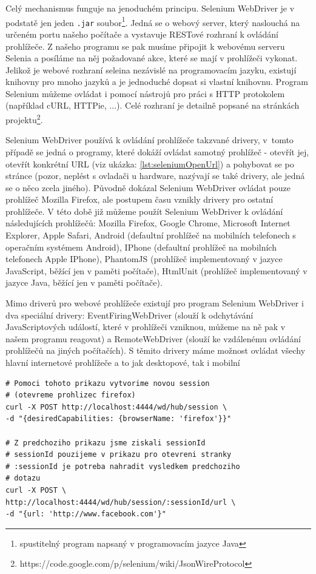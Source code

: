 \documentclass[thesis=M,czech]{FITthesis}[2013/05/10]
\begin{document}
Celý mechanismus funguje na jenoduchém principu. Selenium WebDriver  
je v podstatě jen jeden \verb|.jar| 
soubor\footnote{spustitelný program napsaný v programovacím 
jazyce Java}. 
Jedná se o webový server, který naslouchá na určeném portu našeho 
počítače a vystavuje RESTové rozhraní k ovládání prohlížeče. Z našeho 
programu se pak musíme připojit k webovému serveru Selenia a posíláme 
na něj požadované akce, které se mají v prohlížeči vykonat. Jelikož je 
webové rozhraní seleina nezávislé na programovacím jazyku, existují 
knihovny pro mnoho jazyků a je jednoduché dopsat si vlastní knihovnu. 
Program Selenium můžeme ovládat i pomocí nástrojů pro práci s HTTP 
protokolem (například cURL, HTTPie, ...). Celé rozhraní je detailně 
popsané na stránkách 
projektu\footnote{https://code.google.com/p/selenium/wiki/JsonWireProtocol}.

Selenium WebDriver používá k ovládání prohlížeče takzvané drivery, 
v~tomto případě se jedná o programy, které dokáží ovládat samotný 
prohlížeč - otevřít jej, otevřít konkrétní 
URL (viz ukázka: \ref{lst:seleniumOpenUrl}) a pohybovat se 
po stránce (pozor, neplést s ovladači u hardware, nazývají se také 
drivery, ale jedná se o něco zcela jiného). Původně dokázal Selenium 
WebDriver ovládat pouze prohlížeč Mozilla Firefox, ale postupem času 
vznikly drivery pro ostatní prohlížeče. V této době již můžeme použít 
Selenium WebDriver k ovládání následujících prohlížečů: 
Mozilla Firefox, Google Chrome, Microsoft Internet Explorer, Apple 
Safari, Android (defaultní prohlížeč na mobilních telefonech s 
operačním systémem Android), IPhone (defaultní prohlížeč na mobilních 
telefonech Apple IPhone), PhantomJS (prohlížeč implementovaný v jazyce 
JavaScript, běžící jen v paměti počítače), HtmlUnit (prohlížeč 
implementovaný v jazyce Java, běžící jen v paměti počítače). 

Mimo driverů pro webové prohlížeče existují pro 
program Selenium WebDriver i dva speciální 
drivery: EventFiringWebDriver (slouží k odchytávání JavaScriptových 
událostí, které v prohlížeči vzniknou, můžeme na ně pak v našem 
programu reagovat) a RemoteWebDriver (slouží ke vzdálenému ovládání 
prohlížečů na jiných počítačích). S těmito drivery máme možnost 
ovládat všechy hlavní internetové prohlížeče a to jak desktopové, tak 
i mobilní

\begin{lstlisting}[caption={Příklad otevření url v seleniu pomocí CURL},label=lst:seleniumOpenUrl,belowcaptionskip=0.4cm]
# Pomoci tohoto prikazu vytvorime novou session 
# (otevreme prohlizec firefox)
curl -X POST http://localhost:4444/wd/hub/session \
-d "{desiredCapabilities: {browserName: 'firefox'}}"

# Z predchoziho prikazu jsme ziskali sessionId
# sessionId pouzijeme v prikazu pro otevreni stranky
# :sessionId je potreba nahradit vysledkem predchoziho
# dotazu
curl -X POST \
http://localhost:4444/wd/hub/session/:sessionId/url \
-d "{url: 'http://www.facebook.com'}" 
\end{lstlisting}
\end{document}
